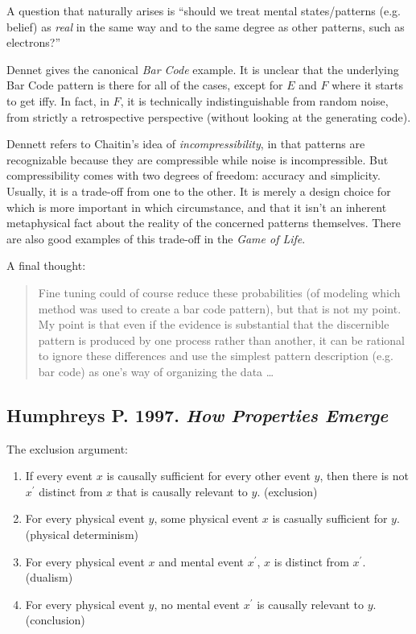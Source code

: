 \documentclass{article}
\newcommand{\ti}[1]{\textit{#1}}
\newcommand{\p}{^\prime}
\newcommand{\annbibtitle}[2]{\subsection*{#1. \ti{#2}}}
\begin{document}
A question that naturally arises is ``should we treat mental states/patterns (e.g. belief) as \ti{real} in the same way and to the same degree as other patterns, such as electrons?''

Dennet gives the canonical \ti{Bar Code} example. It is unclear that the underlying Bar Code pattern is there for all of the cases, except for $E$ and $F$ where it starts to get iffy. In fact, in $F$, it is technically indistinguishable from random noise, from strictly a retrospective perspective (without looking at the generating code).

Dennett refers to Chaitin's idea of \ti{incompressibility}, in that patterns are recognizable because they are compressible while noise is incompressible. But compressibility comes with two degrees of freedom: accuracy and simplicity. Usually, it is a trade-off from one to the other. It is merely a design choice for which is more important in which circumstance, and that it isn't an inherent metaphysical fact about the reality of the concerned patterns themselves. There are also good examples of this trade-off in the \ti{Game of Life}.

A final thought:
\begin{quote}
Fine tuning could of course reduce these probabilities (of modeling which method was used to create a bar code pattern), but that is not my point. My point is that even if the evidence is substantial that the discernible pattern is produced by one process rather than another, it can be rational to ignore these differences and use the simplest pattern description (e.g. bar code) as one's way of organizing the data \dots
\end{quote}

\annbibtitle{Humphreys P. 1997}{How Properties Emerge}

The exclusion argument:

\begin{enumerate}
    \item If every event $x$ is causally sufficient for every other event $y$, then there is not $x\p$ distinct from $x$ that is causally relevant to $y$. (exclusion)
    \item For every physical event $y$, some physical event $x$ is casually sufficient for $y$. (physical determinism)
    \item For every physical event $x$ and mental event $x\p$, $x$ is distinct from $x\p$. (dualism)
    \item For every physical event $y$, no mental event $x\p$ is causally relevant to $y$. (conclusion)
\end{enumerate}
\end{document}
